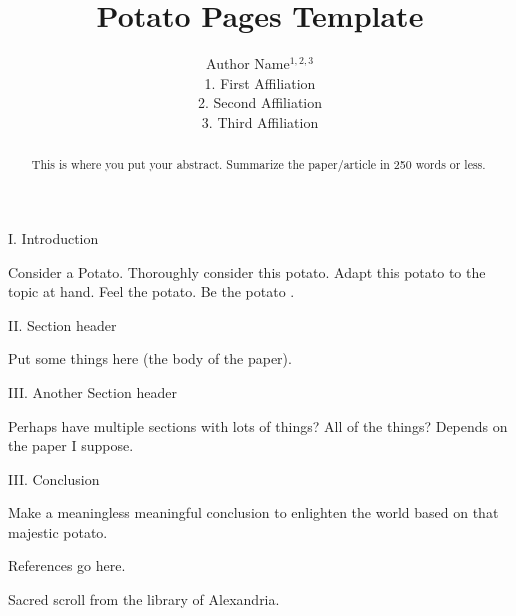 \documentclass[11pt]{article}
\title{Potato Pages Template}
\author{Author Name$^{1,2,3}$\\ \scriptsize{1. First Affiliation} \\ \scriptsize{2. Second Affiliation} \\ \scriptsize{3. Third Affiliation}}
\date{}
\begin{document}
\maketitle
\thispagestyle{fancy}

\begin{abstract}
	This is where you put your abstract. Summarize the paper/article in 250 words or less.
\end{abstract}

\begin{multicols}{2}
	
\begin{center}
	I. Introduction
\end{center}

Consider a Potato. Thoroughly consider this potato. Adapt this potato to the topic at hand. Feel the potato. Be the potato \cite{scroll}.

\begin{center}
	II. Section header
\end{center}

Put some things here (the body of the paper). 

\begin{center}
	III. Another Section header
\end{center}

Perhaps have multiple sections with lots of things? All of the things? Depends on the paper I suppose.

\begin{center}
	III. Conclusion
\end{center}

Make a meaningless meaningful conclusion to enlighten the world based on that majestic potato. 


\begin{thebibliography}{9}
	{\footnotesize
	 References go here.
	
	 Sacred scroll from the library of Alexandria. 
	}
\end{thebibliography}
\end{multicols}

\end{document}

